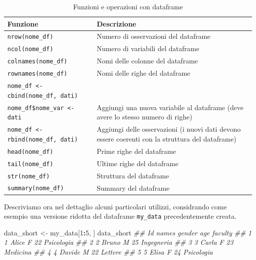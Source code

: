 \documentclass[
]{book}
\newenvironment{Shaded}{\begin{snugshade}}{\end{snugshade}}
\newcommand{\CommentTok}[1]{\textcolor[rgb]{0.56,0.35,0.01}{\textit{#1}}}
\newcommand{\DecValTok}[1]{\textcolor[rgb]{0.00,0.00,0.81}{#1}}
\newcommand{\NormalTok}[1]{#1}
\newcommand{\OperatorTok}[1]{\textcolor[rgb]{0.81,0.36,0.00}{\textbf{#1}}}
\newcommand{\StringTok}[1]{\textcolor[rgb]{0.31,0.60,0.02}{#1}}
\begin{document}
\begin{table}[!h]

\caption{\label{tab:table-df-functions}Funzioni e operazioni con dataframe}
\centering
\begin{tabular}[t]{l|l}
\hline
Funzione & Descrizione\\
\hline
\texttt{nrow(nome\_df)} & Numero di osservazioni del dataframe\\
\hline
\texttt{ncol(nome\_df)} & Numero di variabili del dataframe\\
\hline
\texttt{colnames(nome\_df)} & Nomi delle colonne del dataframe\\
\hline
\texttt{rownames(nome\_df)} & Nomi delle righe del dataframe\\
\hline
\texttt{nome\_df <- cbind(nome\_df, dati)} \\ \texttt{nome\_df\$nome\_var <- dati} & Aggiungi una nuova variabile al dataframe (deve avere lo stesso numero di righe)\\
\hline
\texttt{nome\_df <- rbind(nome\_df, dati)} & Aggiungi delle osservazioni (i nuovi dati devono essere coerenti con la struttura del dataframe)\\
\hline
\texttt{head(nome\_df)} & Prime righe del dataframe\\
\hline
\texttt{tail(nome\_df)} & Ultime righe del dataframe\\
\hline
\texttt{str(nome\_df)} & Struttura del dataframe\\
\hline
\texttt{summary(nome\_df)} & Summary del dataframe\\
\hline
\end{tabular}
\end{table}

Descriviamo ora nel dettaglio alcuni particolari utilizzi, considrando come esempio una versione ridotta del dataframe \texttt{my\_data} precedentemente creata.

\begin{Shaded}
\begin{Highlighting}[]
\NormalTok{data_short <-}\StringTok{ }\NormalTok{my_data[}\DecValTok{1}\OperatorTok{:}\DecValTok{5}\NormalTok{, ]}
\NormalTok{data_short}
\CommentTok{##   Id  names gender age    faculty}
\CommentTok{## 1  1  Alice      F  22 Psicologia}
\CommentTok{## 2  2  Bruno      M  25 Ingegneria}
\CommentTok{## 3  3  Carla      F  23   Medicina}
\CommentTok{## 4  4 Davide      M  22    Lettere}
\CommentTok{## 5  5  Elisa      F  24 Psicologia}
\end{Highlighting}
\end{Shaded}
\end{document}
